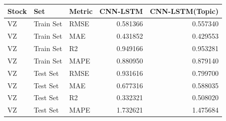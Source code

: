 \begin{tabular}{lllrr}
\toprule
Stock & Set & Metric & CNN-LSTM & CNN-LSTM(Topic) \\
\midrule
VZ & Train Set & RMSE & 0.581366 & 0.557340 \\
VZ & Train Set & MAE & 0.431852 & 0.429553 \\
VZ & Train Set & R2 & 0.949166 & 0.953281 \\
VZ & Train Set & MAPE & 0.880950 & 0.879140 \\
VZ & Test Set & RMSE & 0.931616 & 0.799700 \\
VZ & Test Set & MAE & 0.677316 & 0.588035 \\
VZ & Test Set & R2 & 0.332321 & 0.508020 \\
VZ & Test Set & MAPE & 1.732621 & 1.475684 \\
\bottomrule
\end{tabular}
